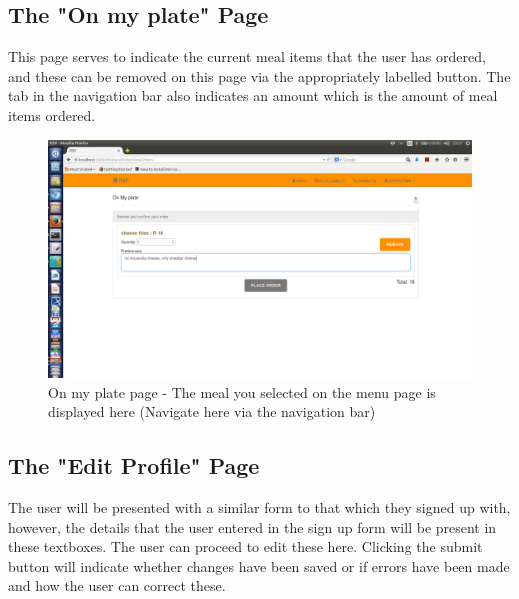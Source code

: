 \documentclass[a4paper,12pt]{article}
\begin{document}
\subsection{The "On my plate" Page} 
This page serves to indicate the current meal items that the user has ordered, and these can be removed on this page via the appropriately labelled button. The tab in the navigation bar also indicates an amount which is the amount of meal items ordered.

\begin{figure}[H]
  \centering
    \includegraphics[width=1.0\textwidth]{screenshots/addedOnPlate.png}
    \caption{On my plate page - The meal you selected on the menu page is displayed here (Navigate here via the navigation bar)} 
\end{figure}

\subsection{The "Edit Profile" Page} 
The user will be presented with a similar form to that which they signed up with, however, the details that the user entered in the sign up form will be present in these textboxes. The user can proceed to edit these here. Clicking the submit button will indicate whether changes have been saved or if errors have been made and how the user can correct these.
\end{document}
